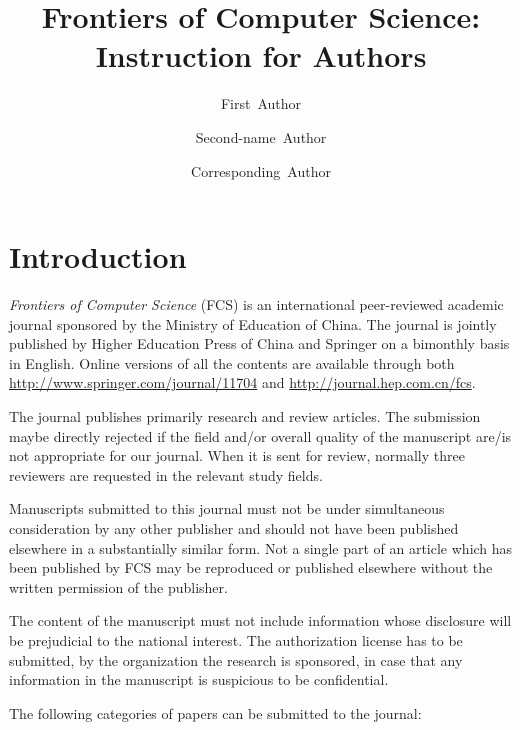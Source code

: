 \documentclass[review]{fcs}
\title{Frontiers of Computer Science: Instruction for Authors}
\author[1,*]{First~Author}
\author[2,*]{Second-name~Author}
\author[1,2,+]{Corresponding~Author}
\begin{document}
\section{Introduction}

\emph{Frontiers of Computer Science} (FCS) is an international peer-reviewed academic journal sponsored by the Ministry of Education of China. The journal is jointly published by Higher Education Press of China and Springer on a bimonthly basis in English. Online versions of all the contents are available through both \url{http://www.springer.com/journal/11704} and \url{http://journal.hep.com.cn/fcs}.

The journal publishes primarily research and review articles. The submission maybe directly rejected if the field and/or overall quality of the manu\-script are/is not appropriate for our journal. When it is sent for review, normally three reviewers are requested in the relevant study fields.

Manuscripts submitted to this journal must not be under simultaneous consideration by any other publisher and should not have been published elsewhere in a substantially similar form. Not a single part of an article which has been published by FCS may be reproduced or published elsewhere without the written permission of the publisher.

The content of the manuscript must not include information whose disclosure will be prejudicial to the national interest. The authorization license has to be submitted, by the organization the research is sponsored, in case that any information in the manuscript is suspicious to be confidential.

The following categories of papers can be submitted to the journal:
\end{document}
